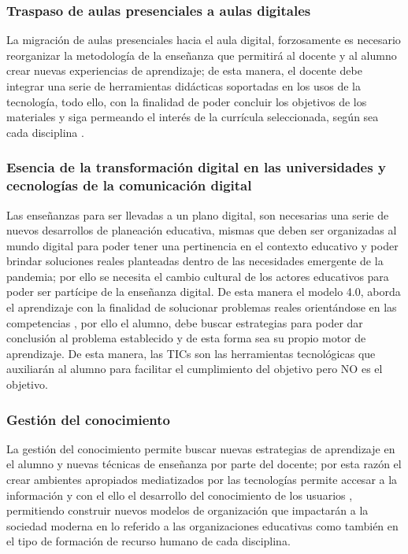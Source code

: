 \documentclass{article}
\begin{document}
\subsubsection{Traspaso de aulas presenciales a aulas digitales}
La migración de aulas presenciales hacia el aula digital, forzosamente es necesario reorganizar la metodología de la enseñanza que permitirá al docente y al alumno crear nuevas experiencias de aprendizaje; de esta manera, el docente debe integrar una serie de herramientas didácticas soportadas en los usos de la tecnología, todo ello, con la finalidad de poder concluir los objetivos de los materiales y siga permeando el interés de la currícula seleccionada, según sea cada disciplina \citep{Certificacion}.

\subsubsection{Esencia de la transformación digital en las universidades y cecnologías de la comunicación digital}
Las enseñanzas para ser llevadas a un plano digital, son necesarias una serie de nuevos desarrollos de planeación educativa, mismas que deben ser organizadas al mundo digital \citep{Modelos} para poder tener una pertinencia en el contexto educativo y poder brindar soluciones reales planteadas dentro de las necesidades emergente de la pandemia; por ello se necesita el cambio cultural de los actores educativos para poder ser partícipe de la enseñanza digital.
De esta manera el modelo 4.0, aborda el aprendizaje con la finalidad de solucionar problemas reales orientándose en las competencias \citep{Mapfre}, por ello el alumno, debe buscar estrategias para poder dar conclusión al problema establecido y de esta forma sea su propio motor de aprendizaje. De esta manera, las TICs son las herramientas tecnológicas que auxiliarán al alumno para facilitar el cumplimiento del objetivo pero NO es el objetivo.

\subsubsection{Gestión del conocimiento}
La gestión del conocimiento permite buscar nuevas estrategias de aprendizaje en el alumno y nuevas técnicas de enseñanza por parte del docente; por esta razón el crear ambientes apropiados mediatizados por las tecnologías permite accesar a la información y con el ello el desarrollo del conocimiento de los usuarios \citep{Botero}, permitiendo construir nuevos modelos de organización que impactarán a la sociedad moderna en lo referido a las organizaciones educativas como también en el tipo de formación de recurso humano de cada disciplina.
\end{document}
